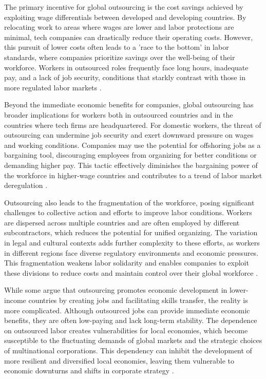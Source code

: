 \begin{refsection}
The primary incentive for global outsourcing is the cost savings achieved by exploiting wage differentials between developed and developing countries. By relocating work to areas where wages are lower and labor protections are minimal, tech companies can drastically reduce their operating costs. However, this pursuit of lower costs often leads to a 'race to the bottom' in labor standards, where companies prioritize savings over the well-being of their workforce. Workers in outsourced roles frequently face long hours, inadequate pay, and a lack of job security, conditions that starkly contrast with those in more regulated labor markets \cite[pp.~230-233]{friedman2012world}.

Beyond the immediate economic benefits for companies, global outsourcing has broader implications for workers both in outsourced countries and in the countries where tech firms are headquartered. For domestic workers, the threat of outsourcing can undermine job security and exert downward pressure on wages and working conditions. Companies may use the potential for offshoring jobs as a bargaining tool, discouraging employees from organizing for better conditions or demanding higher pay. This tactic effectively diminishes the bargaining power of the workforce in higher-wage countries and contributes to a trend of labor market deregulation \cite[pp.~189-192]{stiglitz2017globalization}.

Outsourcing also leads to the fragmentation of the workforce, posing significant challenges to collective action and efforts to improve labor conditions. Workers are dispersed across multiple countries and are often employed by different subcontractors, which reduces the potential for unified organizing. The variation in legal and cultural contexts adds further complexity to these efforts, as workers in different regions face diverse regulatory environments and economic pressures. This fragmentation weakens labor solidarity and enables companies to exploit these divisions to reduce costs and maintain control over their global workforce \cite[pp.~45-47]{milberg2013outsourcing}.

While some argue that outsourcing promotes economic development in lower-income countries by creating jobs and facilitating skills transfer, the reality is more complicated. Although outsourced jobs can provide immediate economic benefits, they are often low-paying and lack long-term stability. The dependence on outsourced labor creates vulnerabilities for local economies, which become susceptible to the fluctuating demands of global markets and the strategic choices of multinational corporations. This dependency can inhibit the development of more resilient and diversified local economies, leaving them vulnerable to economic downturns and shifts in corporate strategy \cite[pp.~98-101]{rodrik2011globalization}.


\end{refsection}
